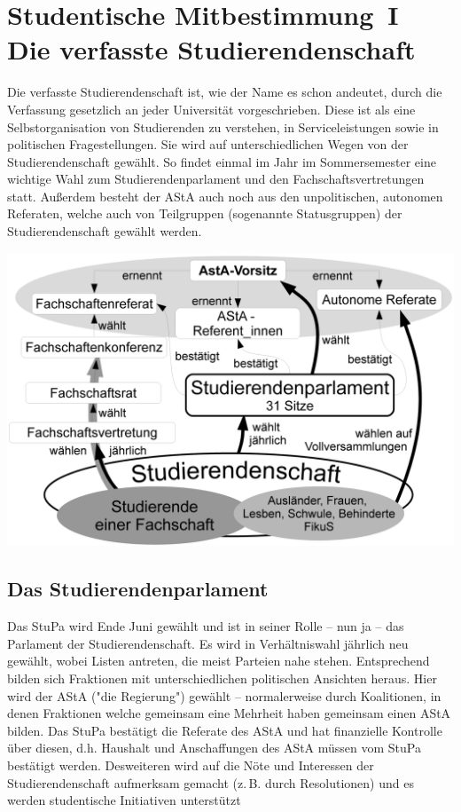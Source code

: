 \section[Studentische Mitbestimmung]{Studentische Mitbestimmung~I\\Die verfasste Studierendenschaft}
\label{studmit}
\begin{multicols*}{2}
Die verfasste Studierendenschaft ist, wie der Name es schon andeutet, durch die Verfassung gesetzlich an jeder Universität vorgeschrieben.
Diese ist als eine Selbstorganisation von Studierenden zu verstehen, in Serviceleistungen sowie in politischen Fragestellungen.
Sie wird auf unterschiedlichen Wegen von der Studierendenschaft gewählt.
So findet einmal im Jahr im Sommersemester eine wichtige Wahl zum Studierendenparlament und den Fachschaftsvertretungen statt.
Außerdem besteht der AStA auch noch aus den unpolitischen, autonomen Referaten, welche auch von Teilgruppen (sogenannte Statusgruppen) der Studierendenschaft gewählt werden.

\bigskip
\includegraphics[width=\columnwidth]{res/verfasste_studierendenschaft.png}
\bigskip

\subsection{Das Studierendenparlament}
Das StuPa wird Ende Juni gewählt und ist  in seiner Rolle – nun ja – das Parlament der Studierendenschaft. Es wird in Verhältniswahl jährlich neu gewählt, wobei Listen antreten, die meist Parteien nahe stehen. Entsprechend bilden sich Fraktionen mit unterschiedlichen politischen Ansichten heraus.
Hier wird der AStA ("die Regierung") gewählt – normalerweise durch Koalitionen, in denen Fraktionen welche gemeinsam eine Mehrheit haben gemeinsam einen AStA bilden. Das StuPa bestätigt die Referate des AStA und hat finanzielle Kontrolle über diesen, d.h. Haushalt und Anschaffungen des AStA müssen vom StuPa bestätigt werden. Desweiteren wird auf die Nöte und Interessen der Studierendenschaft aufmerksam gemacht (z.\,B. durch Resolutionen) und es werden studentische Initiativen unterstützt


\end{multicols*}
